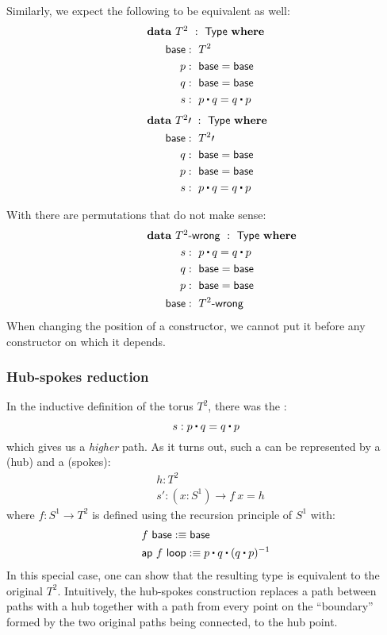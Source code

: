 \documentclass[a4paper,10pt]{article}
\begin{document}
Similarly, we expect the following to be equivalent as well:
%
\begin{alignat*}{2}
  &\rlap{$\data\ T^2\ :\ \Type\ \where$} \\
  &&\ \ \base     &:\ T^2 \\
  &&\ \ p         &:\ \base = \base \\
  &&\ \ q         &:\ \base = \base \\
  &&\ \ s         &:\ p \ct q = q \ct p
\end{alignat*}
%
\begin{alignat*}{2}
  &\rlap{$\data\ T^2 \prime\ :\ \Type\ \where$} \\
  &&\ \ \base     &:\ T^2 \prime \\
  &&\ \ q         &:\ \base = \base \\
  &&\ \ p         &:\ \base = \base \\
  &&\ \ s         &:\ p \ct q = q \ct p
\end{alignat*}

With \hits there are permutations that do not make sense:
\begin{alignat*}{2}
  &\rlap{$\data\ \toruswrong\ :\ \Type\ \where$} \\
  &&\ \ s         &:\ p \ct q = q \ct p \\
  &&\ \ q         &:\ \base = \base \\
  &&\ \ p         &:\ \base = \base \\
  &&\ \ \base     &:\ \toruswrong
\end{alignat*}
When changing the position of a constructor, we cannot put it before
any constructor on which it depends.

\subsubsection{Hub-spokes reduction}

In the inductive definition of the torus $T^2$, there was the \twoconstructor:
$$
s : p \ct q = q \ct p
$$
which gives us a \emph{higher} path. As it turns out, such a
\twoconstructor can be represented by a \zeroconstructor (hub)
and a \oneconstructor (spokes):
%
\begin{align*}
&h : T^2 \\
&s' : (x : S^1) \to f\ x = h
\end{align*}
%
where $f : S^1 \to T^2$ is defined using the recursion principle of
$S^1$ with:
%
\begin{align*}
  &f\ \base \ddefeq \base \\
  &\ap\ f\ \loopcstr \ddefeq p \ct q \ct (q \ct p)^{-1}
\end{align*}
%
In this special case, one can show that the resulting type is
equivalent to the original $T^2$. Intuitively, the hub-spokes
construction replaces a path between paths with a hub together with a
path from every point on the ``boundary'' formed by the two original
paths being connected, to the hub point.
\end{document}

